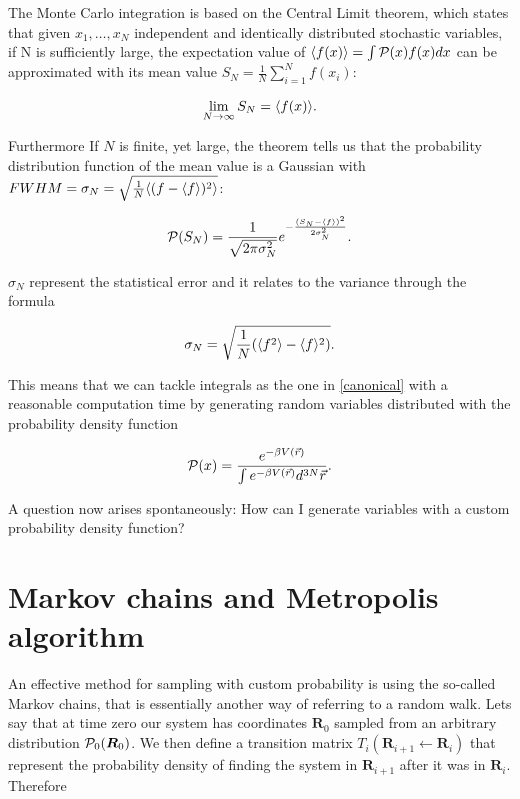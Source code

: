 The Monte Carlo integration is based on the Central Limit theorem, which states that given $x_1,\dots,x_N$ independent and identically distributed stochastic variables, if N is sufficiently large, the expectation value of $\langle  f(x) \rangle=\int \mathcal{P}(x) f(x)dx$ can be approximated with its mean value $S_N=\frac{1}{N}\displaystyle\sum_{i=1}^{N}f(x_i)$:

\begin{equation}
  \lim_{N \to \infty}S_N=\langle  f(x) \rangle.
\end{equation}

Furthermore If $N$ is finite, yet large, the theorem tells us that the probability distribution function of the mean value is a Gaussian with $FWHM=\sigma_N=\sqrt{\frac{1}{N}\langle  (f-\langle  f \rangle)^2 \rangle}$:

\begin{equation}
  \mathcal{P}(S_N)=\frac{1}{\sqrt{2\pi \sigma_N^2}}e^{-\frac{(S_N-\langle  f \rangle)^2}{2\sigma_N^2}}.
\end{equation}

$\sigma_N$ represent the statistical error and it relates to the variance through the formula

\begin{equation}
  \sigma_N=\sqrt{\frac{1}{N}(\langle f^2 \rangle-\langle f \rangle^2)}.
  \label{staterror}
\end{equation}

This means that we can tackle integrals as the one in \autoref{canonical} with a reasonable computation time by generating random variables distributed with the probability density function

\begin{equation}
  \mathcal{P}(x)=\dfrac{ e^{-\beta V(\vec{r})} }{ \int e^{-\beta V(\vec{r})} d^{3N}\vec{r} }.
\end{equation}

A question now arises spontaneously: How can I generate variables with a custom probability density function?

\section{Markov chains and Metropolis algorithm}

\newcommand{\T}[2]{T_{#1}\left(\bm{R}_{#2}\leftarrow \bm{R}_{#1}\right)}
An effective method for sampling with custom probability is using the so-called Markov chains, that is essentially another way of referring to a random walk.
Lets say that at time zero our system has coordinates $\bm{R}_0$ sampled from an arbitrary distribution $\mathcal{P}_0(\bm{R}_0)$.
We then define a transition matrix $\T{i}{i+1}$ that represent the probability density of finding the system in $\bm{R}_{i+1}$ after it was in $\bm{R}_i$. Therefore

